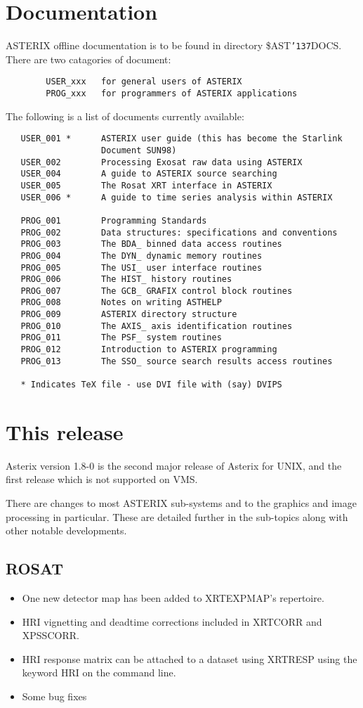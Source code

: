 \documentclass{book}
\renewcommand{\_}{{\tt\char'137}}     %
\begin{document}
\chapter{Documentation}
ASTERIX offline documentation is to be found in directory
\$AST\_DOCS. There are two catagories of document:
\begin{verbatim}
        USER_xxx   for general users of ASTERIX
        PROG_xxx   for programmers of ASTERIX applications
\end{verbatim}
The following is a list of documents currently available:
\begin{verbatim}
   USER_001 *      ASTERIX user guide (this has become the Starlink
                   Document SUN98)
   USER_002        Processing Exosat raw data using ASTERIX
   USER_004        A guide to ASTERIX source searching
   USER_005        The Rosat XRT interface in ASTERIX
   USER_006 *      A guide to time series analysis within ASTERIX
 
   PROG_001        Programming Standards
   PROG_002        Data structures: specifications and conventions
   PROG_003        The BDA_ binned data access routines
   PROG_004        The DYN_ dynamic memory routines
   PROG_005        The USI_ user interface routines
   PROG_006        The HIST_ history routines
   PROG_007        The GCB_ GRAFIX control block routines
   PROG_008        Notes on writing ASTHELP
   PROG_009        ASTERIX directory structure
   PROG_010        The AXIS_ axis identification routines
   PROG_011        The PSF_ system routines
   PROG_012        Introduction to ASTERIX programming
   PROG_013        The SSO_ source search results access routines
 
   * Indicates TeX file - use DVI file with (say) DVIPS
   \end{verbatim}
\chapter{This release}
Asterix version 1.8-0 is the second major release of Asterix for UNIX,
and the first release which is not supported on VMS.
 
There are changes to most ASTERIX sub-systems and to the graphics and
image processing in particular. These are detailed
further in the sub-topics along with other notable developments.
 
\section{ROSAT}
\begin{itemize}
\item One new detector map has been added to XRTEXPMAP's repertoire.
\item HRI vignetting and deadtime corrections included in XRTCORR and XPSSCORR.
\item HRI response matrix can be attached to a dataset using
XRTRESP using the keyword HRI on the command line.
 
\item Some bug fixes
\end{itemize}
\end{document}
